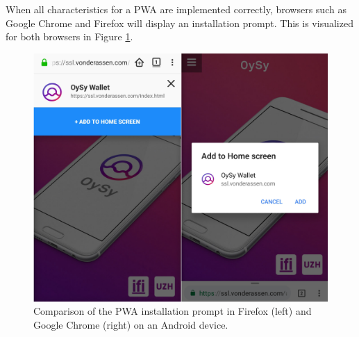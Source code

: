 When all characteristics for a PWA are implemented correctly, browsers such as Google Chrome and Firefox will display an installation prompt. This is visualized for both browsers in Figure \ref{fig:uihomeinstall}.

\begin{figure}
\centering
\includegraphics[width=1\textwidth]{screenshots/Home2.png}
\caption{\label{fig:uihomeinstall}Comparison of the PWA installation prompt in Firefox (left) and Google Chrome (right) on an Android device.}
\end{figure}

